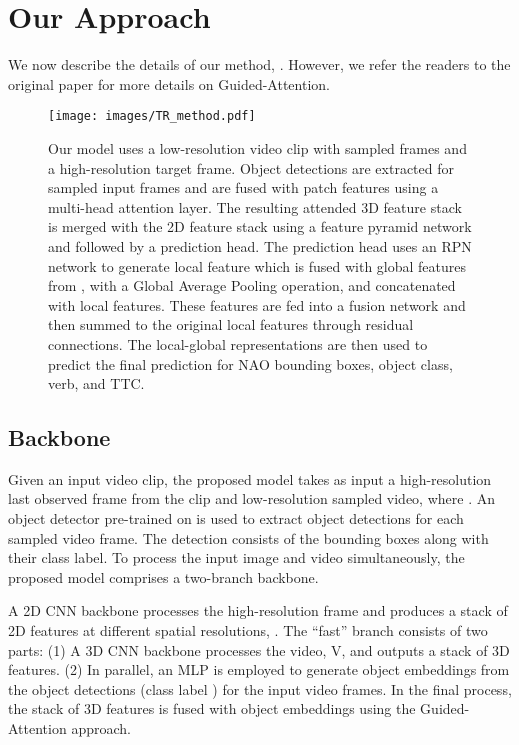\documentclass[10pt,twocolumn,letterpaper]{article}
\begin{document}
\section{Our Approach}
\label{sec:pagestyle}
We now describe the details of our method, . However, we refer the readers to the original paper \cite{gano} for more details on Guided-Attention. 

\begin{figure*}[t!]
\centering
\texttt{[image: images/TR\_method.pdf]}
\caption{Our  model uses a low-resolution video clip with sampled frames and a high-resolution target frame. Object detections are extracted for sampled input frames and are fused with patch features using a multi-head attention layer. The resulting attended 3D feature stack is merged with the 2D feature stack using a feature pyramid network and followed by a prediction head. The prediction head uses an RPN network to generate local feature which is fused with global features from , with a Global Average Pooling operation, and concatenated with local features. These features are fed into a fusion network and then summed to the original local features through residual connections. The local-global representations are then used to predict the final prediction for NAO bounding boxes, object class, verb, and TTC. 
}
\label{fig:method}
\end{figure*}

\subsection{Backbone}
Given an input video clip, the proposed model takes as input a high-resolution last observed frame from the clip and low-resolution sampled video,  where . An object detector \cite{fastercnn} pre-trained on \cite{ego4d} is used to extract object detections for each sampled video frame. The detection consists of the bounding boxes  along with their class label. 
To process the input image and video simultaneously, the proposed model comprises a two-branch backbone.

A 2D CNN backbone processes the high-resolution frame  and produces a stack of 2D features at different spatial resolutions, . 
The ``fast'' branch consists of two parts:  (1) A 3D CNN backbone processes the video, V, and outputs a stack of 3D features. (2) In parallel, an MLP is employed to generate object embeddings from the object detections (class label ) for the input video frames.  
In the final process, the stack of 3D features is fused with object embeddings using the Guided-Attention approach. 
\end{document}
